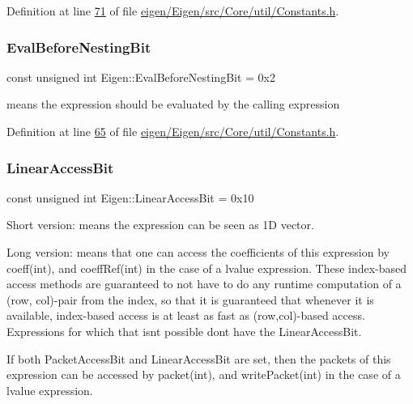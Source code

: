 Definition at line \hyperlink{eigen_2_eigen_2src_2_core_2util_2_constants_8h_source_l00071}{71} of file \hyperlink{eigen_2_eigen_2src_2_core_2util_2_constants_8h_source}{eigen/\+Eigen/src/\+Core/util/\+Constants.\+h}.

\mbox{\label{group__flags_gaa34e83bae46a8eeae4e69ebe3aaecbed}} 
\subsubsection{\texorpdfstring{Eval\+Before\+Nesting\+Bit}{EvalBeforeNestingBit}}
{\footnotesize\ttfamily const unsigned int Eigen\+::\+Eval\+Before\+Nesting\+Bit = 0x2}

means the expression should be evaluated by the calling expression 

Definition at line \hyperlink{eigen_2_eigen_2src_2_core_2util_2_constants_8h_source_l00065}{65} of file \hyperlink{eigen_2_eigen_2src_2_core_2util_2_constants_8h_source}{eigen/\+Eigen/src/\+Core/util/\+Constants.\+h}.

\mbox{\label{group__flags_ga4b983a15d57cd55806df618ac544d09e}} 
\subsubsection{\texorpdfstring{Linear\+Access\+Bit}{LinearAccessBit}}
{\footnotesize\ttfamily const unsigned int Eigen\+::\+Linear\+Access\+Bit = 0x10}

Short version\+: means the expression can be seen as 1D vector.

Long version\+: means that one can access the coefficients of this expression by coeff(int), and coeff\+Ref(int) in the case of a lvalue expression. These index-\/based access methods are guaranteed to not have to do any runtime computation of a (row, col)-\/pair from the index, so that it is guaranteed that whenever it is available, index-\/based access is at least as fast as (row,col)-\/based access. Expressions for which that isn\textquotesingle{}t possible don\textquotesingle{}t have the Linear\+Access\+Bit.

If both Packet\+Access\+Bit and Linear\+Access\+Bit are set, then the packets of this expression can be accessed by packet(int), and write\+Packet(int) in the case of a lvalue expression.

